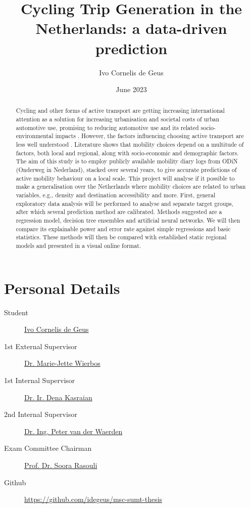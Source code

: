 \documentclass[sigconf, natbib=false, nonacm]{acmart}
\begin{document}
\title{Cycling Trip Generation in the Netherlands: a data-driven prediction}
\author{Ivo Cornelis de Geus}
\date{June 2023}

\begin{abstract}
    Cycling and other forms of active transport are getting increasing international attention as a solution for increasing urbanisation and societal costs of urban automotive use, promising to reducing automotive use and its related socio-environmental impacts \parencite{un_68_2018}. However, the factors influencing choosing active transport are less well understood \parencite{stevens_does_2017, ewing_travel_2010, naess_meta-analyses_2022}. Literature shows that mobility choices depend on a multitude of factors, both local and regional, along with socio-economic and demographic factors. The aim of this study is to employ publicly available mobility diary logs from ODiN (Onderweg in Nederland), stacked over several years, to give accurate predictions of active mobility behaviour on a local scale. This project will analyse if it possible to make a generalisation over the Netherlands where mobility choices are related to urban variables, e.g., density and destination accessibility and more. First, general exploratory data analysis will be performed to analyse and separate target groups, after which several prediction method are calibrated. Methods suggested are a regression model, decision tree ensembles and artificial neural networks. We will then compare its explainable power and error rate against simple regressions and basic statistics. These methods will then be compared with established static regional models and presented in a visual online format.
\end{abstract}

\maketitle

\section{Personal Details}
\begin{description}
    \item[Student] \href{mailto:mail4ivo@gmail.com}{Ivo Cornelis de Geus}
    \item[1st External Supervisor] \href{mailto:marie-jette.wierbos@sweco.nl}{Dr. Marie-Jette Wierbos}
    \item[1st Internal Supervisor] \href{mailto:d.kasraian@tue.nl}{Dr. Ir. Dena Kasraian}
    \item[2nd Internal Supervisor] \href{mailto:p.j.h.j.v.d.waerden@tue.nl}{Dr. Ing. Peter van der Waerden}
    \item[Exam Committee Chairman] \href{mailto:s.rasouli@tue.nl}{Prof. Dr. Soora Rasouli}
    \item[Github] \url{https://github.com/idegeus/msc-sumt-thesis}
\end{description}
\end{document}

